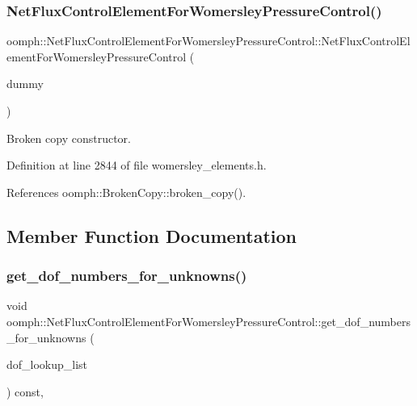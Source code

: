 \subsubsection{\texorpdfstring{Net\+Flux\+Control\+Element\+For\+Womersley\+Pressure\+Control()}{NetFluxControlElementForWomersleyPressureControl()}\hspace{0.1cm}{\footnotesize\ttfamily [2/2]}}
{\footnotesize\ttfamily oomph\+::\+Net\+Flux\+Control\+Element\+For\+Womersley\+Pressure\+Control\+::\+Net\+Flux\+Control\+Element\+For\+Womersley\+Pressure\+Control (\begin{DoxyParamCaption}\item[{const \hyperlink{classoomph_1_1NetFluxControlElementForWomersleyPressureControl}{Net\+Flux\+Control\+Element\+For\+Womersley\+Pressure\+Control} \&}]{dummy }\end{DoxyParamCaption})\hspace{0.3cm}{\ttfamily [inline]}}



Broken copy constructor. 



Definition at line 2844 of file womersley\+\_\+elements.\+h.



References oomph\+::\+Broken\+Copy\+::broken\+\_\+copy().



\subsection{Member Function Documentation}
\mbox{\label{classoomph_1_1NetFluxControlElementForWomersleyPressureControl_a63f6761cad384044fae2c8339422c9df}} 
\subsubsection{\texorpdfstring{get\+\_\+dof\+\_\+numbers\+\_\+for\+\_\+unknowns()}{get\_dof\_numbers\_for\_unknowns()}}
{\footnotesize\ttfamily void oomph\+::\+Net\+Flux\+Control\+Element\+For\+Womersley\+Pressure\+Control\+::get\+\_\+dof\+\_\+numbers\+\_\+for\+\_\+unknowns (\begin{DoxyParamCaption}\item[{std\+::list$<$ std\+::pair$<$ unsigned long, unsigned $>$ $>$ \&}]{dof\+\_\+lookup\+\_\+list }\end{DoxyParamCaption}) const\hspace{0.3cm}{\ttfamily [inline]}, {\ttfamily [virtual]}}



